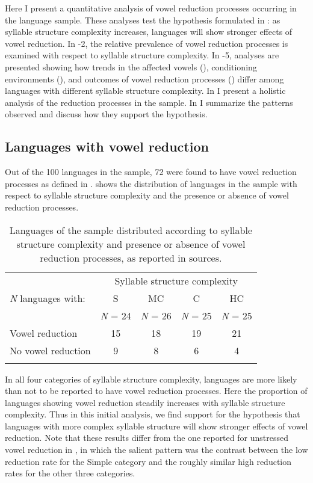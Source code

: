   Here I present a quantitative analysis of vowel reduction processes occurring in the language sample. These analyses test the hypothesis formulated in : as syllable structure complexity increases, languages will show stronger effects of vowel reduction. In -2, the relative prevalence of vowel reduction processes is examined with respect to syllable structure complexity. In -5, analyses are presented showing how trends in the affected vowels (), conditioning environments (), and outcomes of vowel reduction processes () differ among languages with different syllable structure complexity. In  I present a holistic analysis of the reduction processes in the sample. In  I summarize the patterns observed and discuss how they support the hypothesis.

\subsection{Languages with vowel reduction}\label{sec:6.3.1}

  Out of the 100 languages in the sample, 72 were found to have vowel reduction processes as defined in .  shows the distribution of languages in the sample with respect to syllable structure complexity and the presence or absence of vowel reduction processes.

\begin{table}
\begin{tabular}{lcccc}
\lsptoprule
 & \multicolumn{4}{c}{Syllable structure complexity}\\\cmidrule(lr){2-5}
 \textit{N} languages with: & S & MC & C & HC\\
                            & \textit{N} = 24 & \textit{N} = 26 & \textit{N} = 25 & \textit{N} = 25\\\midrule
 Vowel reduction & 15 & 18 & 19 & 21\\
 No vowel reduction & 9 & 8 & 6 & 4\\
\lspbottomrule
\end{tabular}
\caption{\label{tab:6.1}Languages of the sample distributed according to syllable structure complexity and presence or absence of vowel reduction processes, as reported in sources.}
\end{table}

  In all four categories of syllable structure complexity, languages are more likely than not to be reported to have vowel reduction processes. Here the proportion of languages showing vowel reduction steadily increases with syllable structure complexity. Thus in this initial analysis, we find support for the hypothesis that languages with more complex syllable structure will show stronger effects of vowel reduction. Note that these results differ from the one reported for unstressed vowel reduction in , in which the salient pattern was the contrast between the low reduction rate for the Simple category and the roughly similar high reduction rates for the other three categories.

